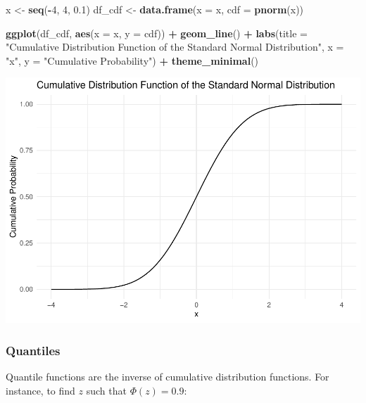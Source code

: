 \documentclass[
]{article}
\newenvironment{Shaded}{\begin{snugshade}}{\end{snugshade}}
\newcommand{\AttributeTok}[1]{\textcolor[rgb]{0.13,0.29,0.53}{#1}}
\newcommand{\DecValTok}[1]{\textcolor[rgb]{0.00,0.00,0.81}{#1}}
\newcommand{\FloatTok}[1]{\textcolor[rgb]{0.00,0.00,0.81}{#1}}
\newcommand{\FunctionTok}[1]{\textcolor[rgb]{0.13,0.29,0.53}{\textbf{#1}}}
\newcommand{\NormalTok}[1]{#1}
\newcommand{\OtherTok}[1]{\textcolor[rgb]{0.56,0.35,0.01}{#1}}
\newcommand{\SpecialCharTok}[1]{\textcolor[rgb]{0.81,0.36,0.00}{\textbf{#1}}}
\newcommand{\StringTok}[1]{\textcolor[rgb]{0.31,0.60,0.02}{#1}}
\begin{document}
\begin{Shaded}
\begin{Highlighting}[]
\NormalTok{x }\OtherTok{\textless{}{-}} \FunctionTok{seq}\NormalTok{(}\SpecialCharTok{{-}}\DecValTok{4}\NormalTok{, }\DecValTok{4}\NormalTok{, }\FloatTok{0.1}\NormalTok{)}
\NormalTok{df\_cdf }\OtherTok{\textless{}{-}} \FunctionTok{data.frame}\NormalTok{(}\AttributeTok{x =}\NormalTok{ x, }\AttributeTok{cdf =} \FunctionTok{pnorm}\NormalTok{(x))}

\FunctionTok{ggplot}\NormalTok{(df\_cdf, }\FunctionTok{aes}\NormalTok{(}\AttributeTok{x =}\NormalTok{ x, }\AttributeTok{y =}\NormalTok{ cdf)) }\SpecialCharTok{+}
  \FunctionTok{geom\_line}\NormalTok{() }\SpecialCharTok{+}
  \FunctionTok{labs}\NormalTok{(}\AttributeTok{title =} \StringTok{"Cumulative Distribution Function of the Standard Normal Distribution"}\NormalTok{,}
       \AttributeTok{x =} \StringTok{"x"}\NormalTok{, }\AttributeTok{y =} \StringTok{"Cumulative Probability"}\NormalTok{) }\SpecialCharTok{+}
  \FunctionTok{theme\_minimal}\NormalTok{()}
\end{Highlighting}
\end{Shaded}

\includegraphics{Probability-Distributions_files/figure-latex/unnamed-chunk-13-1.pdf}

\hypertarget{quantiles}{%
\subsubsection{Quantiles}\label{quantiles}}

Quantile functions are the inverse of cumulative distribution functions.
For instance, to find \(z\) such that \(\Phi(z) = 0.9\):
\end{document}
